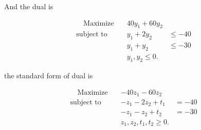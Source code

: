 \documentclass[12pt]{article}
\begin{document}
And the dual is

\begin{equation}\label{p7_dual}
\begin{aligned}
 \quad \text{Maximize} \quad & 40y_1 + 60y_2 & \\
\text{subject\  to} \quad & y_1 + 2y_2 & \leqslant -40 \\
& y_1 + y_2 & \leqslant -30 \\
& y_1, y_2 \leqslant 0.
\end{aligned}
\end{equation}

the standard form of dual is

\begin{equation}\label{p7_dual_std}
\begin{aligned}
 \quad \text{Maximize} \quad & -40z_1 -60z_2 & \\
\text{subject\  to} \quad & -z_1 - 2z_2 + t_1 & = -40 \\
& -z_1 - z_2 + t_2& = -30 \\
& z_1, z_2, t_1, t_2 \geqslant 0.
\end{aligned}
\end{equation}
\end{document}
